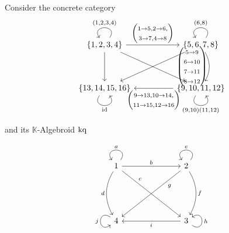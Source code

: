 Consider the concrete category 
\[
\begin{tikzcd}
{\{1,2,3,4\}} \arrow["{(1,2,3,4)}"', loop, distance=2em, in=125, out=55] \arrow[rr, "{\begin{pmatrix} 1\to5, 2\to6, \\ 3\to7, 4\to8 \end{pmatrix}}"] \arrow[dd] \arrow[rrdd] &  & {\{5,6,7,8\}} \arrow["{(6,8)}"', loop, distance=2em, in=125, out=55] \arrow[dd, " \begin{pmatrix}5\to9\\6\to10\\7\to11\\8\to12\end{pmatrix}"', bend left] \arrow[lldd] \\
                                                                                                                                                                             &  &                                                                                                                                                                        \\
{\{13,14,15,16\}} \arrow["\textup{id}"', loop, distance=2em, in=305, out=235]                                                                                                &  & {\{9,10,11,12\}} \arrow["{(9,10)(11,12)}"', loop, distance=2em, in=305, out=235] \arrow[ll, "{\begin{pmatrix}9\to13, 10\to14,\\ 11\to 15, 12\to16\end{pmatrix}}"]     
\end{tikzcd}
\]

and its $\mathbb{K}$-Algebroid $\textup{kq}$

\[
\begin{tikzcd}
1 \arrow["a"', loop, distance=2em, in=125, out=55] \arrow[rrr, "b"] \arrow[ddd, "d"', bend right] \arrow[rrrddd, "c", pos=0.25] &  &  & 2 \arrow["e"', loop, distance=2em, in=125, out=55] \arrow[ddd, "f", bend left] \arrow[lllddd, "g", pos=0.25] \\
                                                                                                                      &  &  &                                                                                                     \\
                                                                                                                      &  &  &                                                                                                     \\
4 \arrow["j"', loop, distance=2em, in=215, out=145]                                                                   &  &  & 3 \arrow["h"', loop, distance=2em, in=35, out=325] \arrow[lll, "i"]                                
\end{tikzcd}
\]

